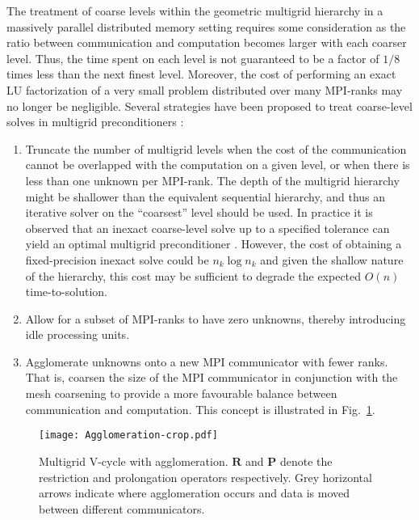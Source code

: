 \documentclass[]{siamart0216}
\newcommand{\dmat}[1]{\mathbf{#1}}
\begin{document}
The treatment of coarse levels within the geometric multigrid hierarchy in a massively parallel distributed memory setting
requires some consideration as the ratio 
between communication and computation becomes larger with each coarser level.
Thus, the time spent on each level is not guaranteed to be a factor of $1/8$ times less 
than the next finest level. 
Moreover, the cost of performing an exact LU factorization of a 
very small problem distributed over many MPI-ranks may no longer be negligible. 
Several strategies have been proposed to treat coarse-level solves in multigrid preconditioners \cite{trottenberg2000multigrid}:
\begin{enumerate}
\setlength\itemsep{0em}
\item Truncate the number of multigrid levels when the cost of the communication cannot be 
overlapped with the computation on a given level, or when there is less than one unknown per MPI-rank. 
The depth of the multigrid hierarchy might be shallower than the equivalent sequential hierarchy, and thus 
an iterative solver on the ``coarsest'' level should be used. 
In practice it is observed that an inexact coarse-level solve up to a specified tolerance can yield an optimal 
multigrid preconditioner \cite{may2015scalable,trottenberg2000multigrid}. 
However, the cost of obtaining a fixed-precision inexact solve could be $n_k \log n_k$ 
and given the shallow nature of the hierarchy, this cost may be sufficient to degrade the expected $O(n)$ time-to-solution.
\item Allow for a subset of MPI-ranks to have zero unknowns, thereby introducing idle processing units. 
\item Agglomerate unknowns onto a new MPI communicator with fewer ranks. 
That is, coarsen the size of the MPI communicator in conjunction with the mesh coarsening to provide 
a more favourable balance between communication and computation. 
This concept is illustrated in Fig.~\ref{fig:agglom}.
\end{enumerate}
\begin{figure}[h!]
\centering
\texttt{[image: Agglomeration-crop.pdf]}
\caption{Multigrid V-cycle with agglomeration. $\dmat R$ and $\dmat P$ denote the restriction and prolongation operators respectively. 
Grey horizontal arrows indicate where agglomeration occurs and data is moved between different communicators. \label{fig:agglom}}
\end{figure}
\end{document}
